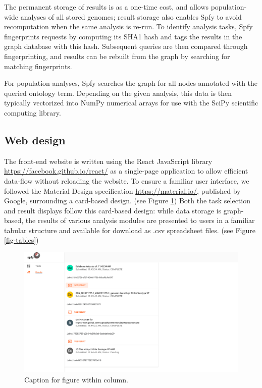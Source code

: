 \documentclass[a4,center,fleqn]{NAR}
\begin{document}
The permanent storage of results is as a one-time cost, and allows population-wide analyses of all stored genomes; result storage also enables Spfy to avoid recomputation when the same analysis is re-run. To identify analysis tasks, Spfy fingerprints requests by computing its SHA1 hash and tags the results in the graph database with this hash. Subsequent queries are then compared through fingerprinting, and results can be rebuilt from the graph by searching for matching fingerprints.

For population analyses, Spfy searches the graph for all nodes annotated with the queried ontology term. Depending on the given analysis, this data is then typically vectorized into NumPy numerical arrays for use with the SciPy scientific computing library.

\subsection{Web design}

The front-end website is written using the React JavaScript library \url{https://facebook.github.io/react/} as a single-page application to allow efficient data-flow without reloading the website.
To ensure a familiar user interface, we followed the Material Design specification \url{https://material.io/}, published by Google, surrounding a card-based design.
(see Figure \ref{fig-results})
Both the task selection and result displays follow this card-based design: while data storage is graph-based, the results of various analysis modules are presented to users in a familiar tabular structure and available for download as .csv spreadsheet files.
(see Figure \ref{fig-tables})

\begin{figure}[t]
\begin{center}
\includegraphics{images/results.png}
\end{center}
\caption{Caption for figure within column.}
\label{fig-results}
\end{figure}
\end{document}
